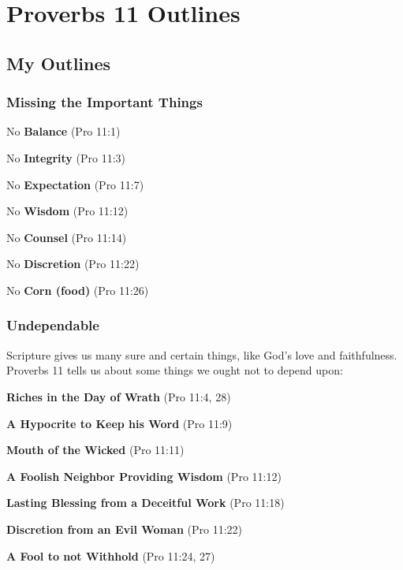\section{Proverbs 11 Outlines}


\subsection{My Outlines}

\subsubsection{Missing the Important Things}
\begin{compactenum}[I.]
    \item No \textbf{Balance}  (Pro 11:1) 
    \item No \textbf{Integrity}  (Pro 11:3) 
    \item No \textbf{Expectation}  (Pro 11:7) 
    \item No \textbf{Wisdom} (Pro 11:12) 
    \item No \textbf{Counsel} (Pro 11:14) 
    \item No \textbf{Discretion} (Pro 11:22) 
    \item No \textbf{Corn (food)} (Pro 11:26) 
\end{compactenum}

\subsubsection{Undependable}
Scripture gives us many sure and certain things, like God's love and faithfulness. Proverbs 11 tells us about some things we ought not to depend upon:
\begin{compactenum}[I.]
    \item \textbf{Riches in the Day of Wrath} (Pro 11:4, 28)
    \item \textbf{A Hypocrite to Keep his Word} (Pro 11:9)
    \item \textbf{Mouth of the Wicked} (Pro 11:11)
    \item \textbf{A Foolish Neighbor Providing Wisdom} (Pro 11:12)
    \item \textbf{Lasting Blessing from a Deceitful Work} (Pro 11:18)
    \item \textbf{Discretion from an Evil Woman} (Pro 11:22)
    \item \textbf{A Fool to not Withhold} (Pro 11:24, 27)
\end{compactenum}

